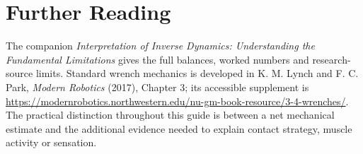 \documentclass[11pt,a4paper]{article}
\begin{document}
\section*{Further Reading}
The companion \emph{Interpretation of Inverse Dynamics: Understanding the Fundamental Limitations} gives the full balances, worked numbers and research-source limits. Standard wrench mechanics is developed in K. M. Lynch and F. C. Park, \emph{Modern Robotics} (2017), Chapter 3; its accessible supplement is \url{https://modernrobotics.northwestern.edu/nu-gm-book-resource/3-4-wrenches/}. The practical distinction throughout this guide is between a net mechanical estimate and the additional evidence needed to explain contact strategy, muscle activity or sensation.
\end{document}
